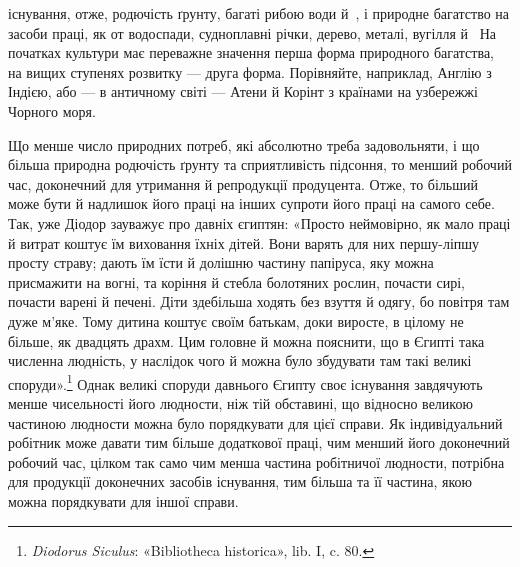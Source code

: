 \parcont{}  %
існування, отже, родючість ґрунту, багаті рибою води й~,
і природне багатство на засоби праці, як от водоспади, судноплавні
річки, дерево, металі, вугілля й~ На початках культури
має переважне значення перша форма природного багатства,
на вищих ступенях розвитку — друга форма. Порівняйте,
наприклад, Англію з Індією, або — в античному світі — Атени
й Корінт з країнами на узбережжі Чорного моря.

Що менше число природних потреб, які абсолютно треба
задовольняти, і що більша природна родючість ґрунту та сприятливість
підсоння, то менший робочий час, доконечний для утримання
й репродукції продуцента. Отже, то більший може бути й
надлишок його праці на інших супроти його праці на самого себе.
Так, уже Діодор зауважує про давніх єгиптян: «Просто неймовірно,
як мало праці й витрат коштує їм виховання їхніх дітей.
Вони варять для них першу-ліпшу просту страву; дають їм
їсти й долішню частину папіруса, яку можна присмажити на
вогні, та коріння й стебла болотяних рослин, почасти сирі, почасти
варені й печені. Діти здебільша ходять без взуття й одягу,
бо повітря там дуже м’яке. Тому дитина коштує своїм батькам,
доки виросте, в цілому не більше, як двадцять драхм. Цим головне
й можна пояснити, що в Єгипті така численна людність,
у наслідок чого й можна було збудувати там такі великі споруди».\footnote{
\emph{Diodorus Siculus}: «Bibliotheca historica», lib. I, c. 80.
}
Однак великі споруди давнього Єгипту своє існування
завдячують менше чисельності його людности, ніж тій обставині,
що відносно великою частиною людности можна було порядкувати
для цієї справи. Як індивідуальний робітник може давати
тим більше додаткової праці, чим менший його доконечний робочий
час, цілком так само чим менша частина робітничої людности,
потрібна для продукції доконечних засобів існування,
тим більша та її частина, якою можна порядкувати для іншої
справи.

